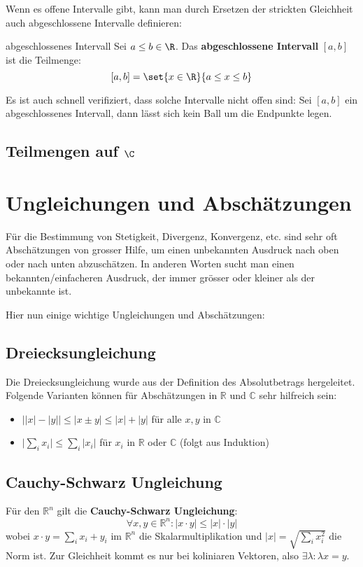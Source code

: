 Wenn es offene Intervalle  gibt, kann man durch Ersetzen der strickten Gleichheit auch abgeschlossene Intervalle definieren:

\begin{definition}{abgeschlossenes Intervall}{} Sei $a \leq b \in \R$. Das \textbf{abgeschlossene Intervall} $[a,b]$ ist die Teilmenge:
$$[a, b] = \set{x \in \R}{a \leq x \leq b}$$
\end{definition}

Es ist auch schnell verifiziert, dass solche Intervalle nicht offen sind: Sei $[a,b]$ ein abgeschlossenes Intervall, dann lässt sich kein Ball um die Endpunkte legen.



\subsection{Teilmengen auf $\C$}

\section{Ungleichungen und Abschätzungen}
Für die Bestimmung von Stetigkeit, Divergenz, Konvergenz, etc. sind sehr oft Abschätzungen von grosser Hilfe, um einen unbekannten Ausdruck nach oben oder nach unten abzuschätzen. In anderen Worten sucht man einen bekannten/einfacheren Ausdruck, der immer grösser oder kleiner als der unbekannte ist.

Hier nun einige wichtige Ungleichungen und Abschätzungen:
\subsection{Dreiecksungleichung}
Die Dreiecksungleichung wurde aus der Definition des Absolutbetrags hergeleitet. Folgende Varianten können für Abschätzungen in  $\mathbb{R}$ und $\mathbb{C}$ sehr hilfreich sein:
\begin{itemize}
    \item $\Big| |x|-|y|\Big| \le |x \pm y| \le |x|+|y|$ für alle $x,y$ in $\mathbb{C}$
    \item $\Big| \sum_i{x_i} \Big| \leq \sum_i{|x_i|}$ für $x_i$ in $\mathbb{R}$ oder $\mathbb{C}$ (folgt aus Induktion)
\end{itemize}

\subsection{Cauchy-Schwarz Ungleichung}
Für den $\mathbb{R}^n$ gilt die \textbf{Cauchy-Schwarz Ungleichung}:
$$\forall x,y \in \mathbb{R}^n: |x \cdot y| \leq |x| \cdot |y|$$
wobei $x \cdot y = \sum_i{x_i + y_i}$ im $\mathbb{R}^n$ die Skalarmultiplikation und $|x| = \sqrt{\sum_i{x_i^2}}$ die Norm ist. Zur Gleichheit kommt es nur bei koliniaren Vektoren, also $\exists \lambda: \lambda x = y$.

